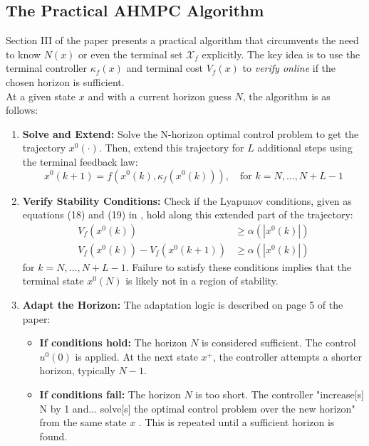 \subsection{The Practical AHMPC Algorithm}
Section III of the paper presents a practical algorithm that circumvents the need to know $N(x)$ or even the terminal set $\mathcal{X}_f$ explicitly. The key idea is to use the terminal controller $\kappa_f(x)$ and terminal cost $V_f(x)$ to \textit{verify online} if the chosen horizon is sufficient.
\\
\noindent
At a given state $x$ and with a current horizon guess $N$, the algorithm is as follows:
\begin{enumerate}
    \item \textbf{Solve and Extend:} Solve the N-horizon optimal control problem to get the trajectory $x^0(\cdot)$. Then, extend this trajectory for $L$ additional steps using the terminal feedback law:
    \begin{equation}
        x^0(k+1) = f(x^0(k), \kappa_f(x^0(k))), \quad \text{for } k = N, \dots, N+L-1
    \end{equation}
    
    \item \textbf{Verify Stability Conditions:} Check if the Lyapunov conditions, given as equations (18) and (19) in \cite{krener2016adaptive}, hold along this extended part of the trajectory:
    \begin{align}
        V_f(x^0(k)) &\ge \alpha(|x^0(k)|) \\
        V_f(x^0(k)) - V_f(x^0(k+1)) &\ge \alpha(|x^0(k)|)
    \end{align}
    for $k = N, \dots, N+L-1$. Failure to satisfy these conditions implies that the terminal state $x^0(N)$ is likely not in a region of stability.
    
    \item \textbf{Adapt the Horizon:} The adaptation logic is described on page 5 of the paper:
    \begin{itemize}
        \item \textbf{If conditions hold:} The horizon $N$ is considered sufficient. The control $u^0(0)$ is applied. At the next state $x^+$, the controller attempts a shorter horizon, typically $N-1$.
        \item \textbf{If conditions fail:} The horizon $N$ is too short. The controller "increase[s] N by 1 and... solve[s] the optimal control problem over the new horizon" from the same state $x$ \cite{krener2016adaptive}. This is repeated until a sufficient horizon is found.
    \end{itemize}
\end{enumerate}

